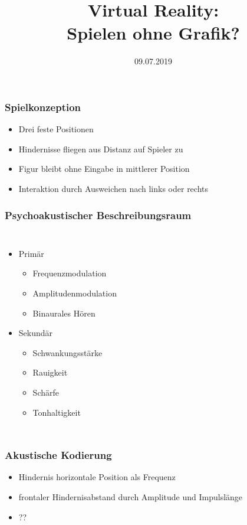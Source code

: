 \documentclass{beamer}
\title{Virtual Reality:\\Spielen ohne Grafik?}
\date{09.07.2019}
\begin{document}
\begin{frame}
\titlepage
\end{frame}

\begin{frame}
\frametitle{Spielkonzeption}

\begin{adjustbox}{max totalsize={.9\textwidth}{.7\textheight}, center}

\end{adjustbox}

\begin{itemize}
	\item Drei feste Positionen
	\item Hindernisse fliegen aus Distanz auf Spieler zu
	\item Figur bleibt ohne Eingabe in mittlerer Position
	\item Interaktion durch Ausweichen nach links oder rechts
\end{itemize}

\end{frame}

\begin{frame}
\frametitle{Psychoakustischer Beschreibungsraum}

\begin{columns}
	\begin{itemize}
		\item Primär
		\begin{itemize}
			\item Frequenzmodulation
			\item Amplitudenmodulation
			\item Binaurales Hören
		\end{itemize}

		\item Sekundär
		\begin{itemize}
			\item Schwankungsstärke
			\item Rauigkeit
			\item Schärfe
			\item Tonhaltigkeit
		\end{itemize}
	\end{itemize}
	
\end{columns}
\end{frame}

\begin{frame}
\frametitle{Akustische Kodierung}
\begin{itemize}
	\item Hindernis horizontale Position als Frequenz
	\item frontaler Hindernisabstand durch Amplitude und Impulslänge
	\item ??
\end{itemize}
\end{frame}
\end{document}
